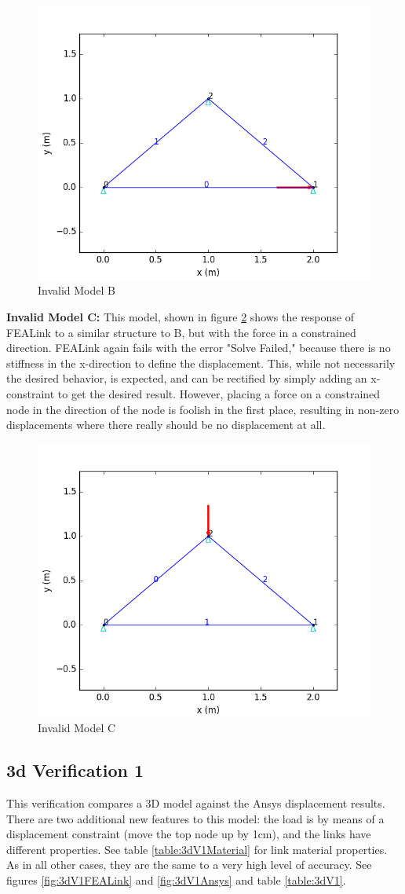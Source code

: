 \documentclass[11pt, oneside]{article}   	%
\begin{document}
\begin{figure}[!h]
\centering
 \includegraphics[width=.5\textwidth]{Verification/FEALink/InvalidB.png}
 \caption{Invalid Model B}
 \label{fig:InvalidB}
\end{figure}

\textbf{Invalid Model C:} This model, shown in figure \ref{fig:InvalidC} shows the response of FEALink to a similar structure to B, but with the force in a constrained direction.  FEALink again fails with the error "Solve Failed," because there is no stiffness in the x-direction to define the displacement.  This, while not necessarily the desired behavior, is expected, and can be rectified by simply adding an x-constraint to get the desired result.  However, placing a force on a constrained node in the direction of the node is foolish in the first place, resulting in non-zero displacements where there really should be no displacement at all.

\begin{figure}[!h]
\centering
 \includegraphics[width=.5\textwidth]{Verification/FEALink/InvalidC.png}
 \caption{Invalid Model C}
 \label{fig:InvalidC}
\end{figure}


\subsection{3d Verification 1}
This verification compares a 3D model against the Ansys displacement results.  There are two additional new features to this model: the load is by means of a displacement constraint (move the top node up by 1cm), and the links have different properties.  See table \ref{table:3dV1Material} for link material properties.  As in all other cases, they are the same to a very high level of accuracy.  See figures \ref{fig:3dV1FEALink} and \ref{fig:3dV1Ansys} and table \ref{table:3dV1}.  
\end{document}

